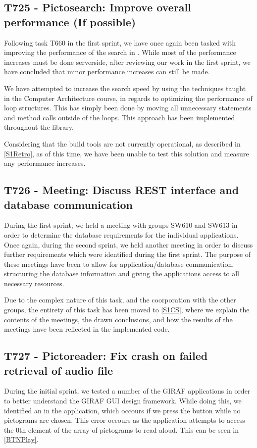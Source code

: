\subsection{T725 - Pictosearch: Improve overall performance (If possible)}
Following task T660 in the first sprint, we have once again been tasked with
improving the performance of the search in . While most
of the performance increases must be done serverside, after reviewing our work
in the first sprint, we have concluded that minor performance increases can
still be made.\nl

We have attempted to increase the search speed by using the techniques taught in
the Computer Architecture course, in regards to optimizing the performance of
loop structures. This has simply been done by moving all unnecessary statements
and method calls outside of the loops. This approach has been implemented
throughout the  library.\nl

Considering that the build tools are not currently operational, as described in
\autoref{S1Retro}, as of this time, we have been unable to test this solution
and measure any performance increases.

\subsection{T726 - Meeting: Discuss REST interface and database communication}
During the first sprint, we held a meeting with groups SW610 and SW613 in order
to determine the database requirements for the individual applications. Once
again, during the second sprint, we held another meeting in order to discuss
further requirements which were identified during the first sprint. The purpose
of these meetings have been to allow for application/database communication,
structuring the database information and giving the applications access to all
necessary resources.\nl

Due to the complex nature of this task, and the coorporation with the other
groups, the entirety of this task has been moved to \autoref{S1CS}, where we
explain the contents of the meetings, the drawn conclusions, and how the results
of the meetings have been reflected in the implemented code.


\subsection{T727 - Pictoreader: Fix crash on failed retrieval of audio file}
\label{T727}
During the initial sprint, we tested a number of the GIRAF applications in order
to better understand the GIRAF GUI design framework. While doing this, we
identified an  in the 
application, which occours if we press the  button while no
pictograms are chosen. This error occours as the application attempts to access
the 0th element of the array of pictograms to read aloud. This can be seen in
\autoref{BTNPlay}.\nl

